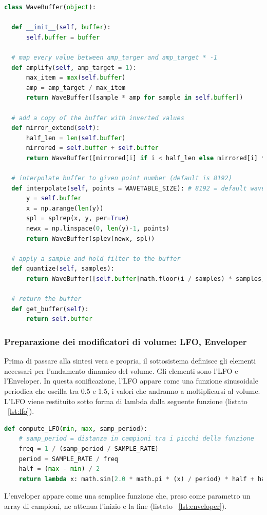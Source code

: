 \begin{lstlisting}[language=Python,caption={La classe che si occupa della generazione di WaveTable.},label={lst:wavebuffer}]
class WaveBuffer(object):

  def __init__(self, buffer):
      self.buffer = buffer

  # map every value between amp_targer and amp_target * -1
  def amplify(self, amp_target = 1):
      max_item = max(self.buffer)
      amp = amp_target / max_item
      return WaveBuffer([sample * amp for sample in self.buffer])

  # add a copy of the buffer with inverted values
  def mirror_extend(self):
      half_len = len(self.buffer)        
      mirrored = self.buffer + self.buffer
      return WaveBuffer([mirrored[i] if i < half_len else mirrored[i] * -1 for i in range(len(mirrored))])

  # interpolate buffer to given point number (default is 8192)
  def interpolate(self, points = WAVETABLE_SIZE): # 8192 = default wavetable size
      y = self.buffer
      x = np.arange(len(y))
      spl = splrep(x, y, per=True)
      newx = np.linspace(0, len(y)-1, points)
      return WaveBuffer(splev(newx, spl))

  # apply a sample and hold filter to the buffer
  def quantize(self, samples):
      return WaveBuffer([self.buffer[math.floor(i / samples) * samples] for i in range(len(self.buffer))])

  # return the buffer
  def get_buffer(self):
      return self.buffer
\end{lstlisting}



\subsubsection{Preparazione dei modificatori di volume: LFO, Enveloper}
Prima di passare alla sintesi vera e propria, il sottosistema definisce gli elementi necessari per l'andamento dinamico del volume.
Gli elementi sono l'LFO e l'Enveloper.
In questa sonificazione, l'LFO appare come una funzione sinusoidale periodica che oscilla tra 0.5 e 1.5, i valori che andranno a moltiplicarsi al volume.
L'LFO viene restituito sotto forma di lambda dalla seguente funzione (listato ~\ref{lst:lfo}).

\begin{lstlisting}[language=Python,caption={Generazione dell'LFO.},label={lst:lfo}]
def compute_LFO(min, max, samp_period): 
    # samp_period = distanza in campioni tra i picchi della funzione
    freq = 1 / (samp_period / SAMPLE_RATE)
    period = SAMPLE_RATE / freq
    half = (max - min) / 2
    return lambda x: math.sin(2.0 * math.pi * (x) / period) * half + half + min
\end{lstlisting}
L'enveloper appare come una semplice funzione che, preso come parametro un array di campioni, ne attenua l'inizio e la fine (listato ~\ref{lst:enveloper}).


